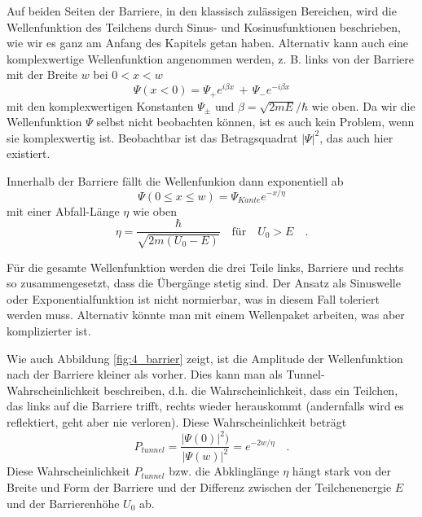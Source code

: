 Auf beiden Seiten der Barriere, in den klassisch zulässigen Bereichen, wird die Wellenfunktion des Teilchens durch Sinus- und Kosinusfunktionen beschrieben, wie wir es ganz am Anfang des Kapitels getan haben. Alternativ kann auch eine komplexwertige Wellenfunktion angenommen werden, z. B. links von der Barriere mit der Breite $w$ bei $0 < x < w$
\begin{equation}
    \Psi(x < 0) = \Psi_{+} e^{i \beta x} \, + \, \Psi_{-} e^{-i \beta x}
\end{equation}
mit den komplexwertigen Konstanten $\Psi_\pm$  und $\beta = \sqrt{2 m E }/ \hbar$ wie oben. Da wir die Wellenfunktion $\Psi$ selbst nicht beobachten können, ist es auch kein Problem, wenn sie komplexwertig ist. Beobachtbar ist das Betragsquadrat $|\Psi|^2$, das auch hier existiert.

Innerhalb der Barriere fällt die Wellenfunkion dann exponentiell ab
\begin{equation}
    \Psi(0 \le x \le w) = \Psi_{Kante} e^{- x / \eta}
\end{equation}
mit einer Abfall-Länge $\eta$ wie oben 
\begin{equation}
    \eta = \frac{\hbar}{\sqrt{2m ( U_0 - E)}} \quad \text{für} \quad U_0 > E \quad .
\end{equation}

Für die gesamte Wellenfunktion werden die drei Teile links, Barriere und rechts so zusammengesetzt, dass die Übergänge stetig sind.  Der Ansatz als Sinuswelle oder Exponentialfunktion ist nicht normierbar, was in diesem Fall toleriert werden muss. Alternativ könnte man mit einem Wellenpaket arbeiten, was aber komplizierter ist.

Wie auch Abbildung \ref{fig:4_barrier} zeigt, ist die Amplitude der Wellenfunktion nach der Barriere kleiner als vorher. Dies kann man als Tunnel-Wahrscheinlichkeit beschreiben, d.h. die Wahrscheinlichkeit, dass ein Teilchen, das links auf die Barriere trifft, rechts wieder herauskommt (andernfalls wird es reflektiert, geht aber nie verloren). Diese Wahrscheinlichkeit beträgt
\begin{equation}
    P_{tunnel} = \frac{|\Psi(0)|^2)} {|\Psi(w)|^2} = e^{-2 w / \eta} \quad .
\end{equation}
Diese Wahrscheinlichkeit $P_{tunnel}$ bzw. die Abklinglänge $\eta$ hängt stark von der Breite und Form der Barriere und der Differenz zwischen der Teilchenenergie $E$ und der Barrierenhöhe $U_0$ ab.

